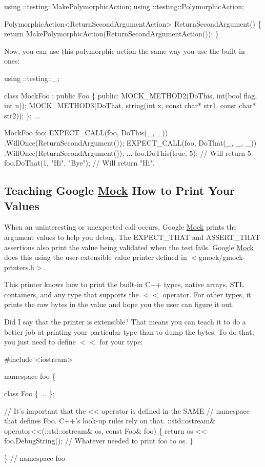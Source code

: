 \begin{DoxyCode}
using ::testing::MakePolymorphicAction;
using ::testing::PolymorphicAction;

PolymorphicAction<ReturnSecondArgumentAction> ReturnSecondArgument() \{
  return MakePolymorphicAction(ReturnSecondArgumentAction());
\}
\end{DoxyCode}


Now, you can use this polymorphic action the same way you use the built-\/in ones\+:


\begin{DoxyCode}
using ::testing::\_;

class MockFoo : public Foo \{
 public:
  MOCK\_METHOD2(DoThis, int(bool flag, int n));
  MOCK\_METHOD3(DoThat, string(int x, const char* str1, const char* str2));
\};
...

  MockFoo foo;
  EXPECT\_CALL(foo, DoThis(\_, \_))
      .WillOnce(ReturnSecondArgument());
  EXPECT\_CALL(foo, DoThat(\_, \_, \_))
      .WillOnce(ReturnSecondArgument());
  ...
  foo.DoThis(true, 5);         // Will return 5.
  foo.DoThat(1, "Hi", "Bye");  // Will return "Hi".
\end{DoxyCode}


\subsection*{Teaching Google \hyperlink{class_mock}{Mock} How to Print Your Values}

When an uninteresting or unexpected call occurs, Google \hyperlink{class_mock}{Mock} prints the argument values to help you debug. The {\ttfamily E\+X\+P\+E\+C\+T\+\_\+\+T\+H\+AT} and {\ttfamily A\+S\+S\+E\+R\+T\+\_\+\+T\+H\+AT} assertions also print the value being validated when the test fails. Google \hyperlink{class_mock}{Mock} does this using the user-\/extensible value printer defined in {\ttfamily $<$gmock/gmock-\/printers.\+h$>$}.

This printer knows how to print the built-\/in C++ types, native arrays, S\+TL containers, and any type that supports the {\ttfamily $<$$<$} operator. For other types, it prints the raw bytes in the value and hope you the user can figure it out.

Did I say that the printer is {\ttfamily extensible}? That means you can teach it to do a better job at printing your particular type than to dump the bytes. To do that, you just need to define {\ttfamily $<$$<$} for your type\+:


\begin{DoxyCode}
#include <iostream>

namespace foo \{

class Foo \{ ... \};

// It's important that the << operator is defined in the SAME
// namespace that defines Foo.  C++'s look-up rules rely on that.
::std::ostream& operator<<(::std::ostream& os, const Foo& foo) \{
  return os << foo.DebugString();  // Whatever needed to print foo to os.
\}

\}  // namespace foo
\end{DoxyCode}


